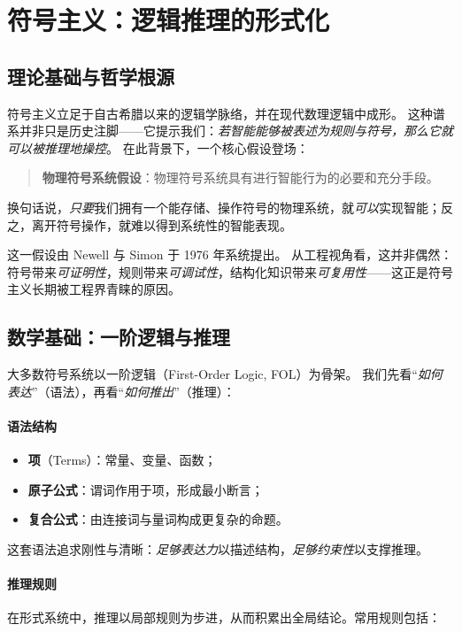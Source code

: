 \section{符号主义：逻辑推理的形式化}

\subsection{理论基础与哲学根源}

符号主义立足于自古希腊以来的逻辑学脉络，并在现代数理逻辑中成形。  
这种谱系并非只是历史注脚——它提示我们：\emph{若智能能够被表述为规则与符号，那么它就可以被推理地操控}。  
在此背景下，一个核心假设登场：

\begin{quote}
\textbf{物理符号系统假设}：物理符号系统具有进行智能行为的必要和充分手段。
\end{quote}
换句话说，\emph{只要}我们拥有一个能存储、操作符号的物理系统，就\emph{可以}实现智能；反之，离开符号操作，就难以得到系统性的智能表现。

这一假设由 Newell 与 Simon 于 1976 年系统提出。  
从工程视角看，这并非偶然：符号带来\emph{可证明性}，规则带来\emph{可调试性}，结构化知识带来\emph{可复用性}——这正是符号主义长期被工程界青睐的原因。

\subsection{数学基础：一阶逻辑与推理}

大多数符号系统以一阶逻辑（First-Order Logic, FOL）为骨架。  
我们先看“\emph{如何表达}”（语法），再看“\emph{如何推出}”（推理）：

\paragraph{语法结构}
\begin{itemize}
\item \textbf{项}（Terms）：常量、变量、函数；
\item \textbf{原子公式}：谓词作用于项，形成最小断言；
\item \textbf{复合公式}：由连接词与量词构成更复杂的命题。
\end{itemize}
这套语法追求刚性与清晰：\emph{足够表达力}以描述结构，\emph{足够约束性}以支撑推理。

\paragraph{推理规则}
在形式系统中，推理以局部规则为步进，从而积累出全局结论。常用规则包括：

